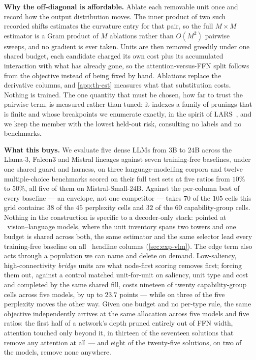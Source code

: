 \textbf{Why the off-diagonal is affordable.} Ablate each removable unit once and record how the output
distribution moves. The inner product of two such recorded shifts estimates the curvature entry for
that pair, so the full $M\times M$ estimator is a Gram product of $M$ ablations rather than $O(M^2)$
pairwise sweeps, and no gradient is ever taken. Units are then removed greedily under one shared
budget, each candidate charged its own cost plus its accumulated interaction with what has already
gone, so the attention-versus-FFN split follows from the objective instead of being fixed by hand.
Ablations replace the derivative columns, and \cref{app:th-est} measures what that substitution costs.
Nothing is trained. The one quantity that must be chosen, how far to
trust the pairwise term, is measured rather than tuned: it indexes a family of prunings that is finite
and whose breakpoints we enumerate exactly, in the spirit of LARS~\citep{efron2004lars}, and we keep
the member with the lowest held-out risk, consulting no labels and no benchmarks.

\textbf{What this buys.} We evaluate five dense LLMs from $3$B to $24$B across the Llama-3, Falcon3 and
Mistral lineages against seven training-free baselines, under one shared guard and harness, on three
language-modelling corpora and twelve multiple-choice benchmarks scored on their full test sets at
five ratios from $10\%$ to $50\%$, all five of them on Mistral-Small-24B. Against the per-column best of every baseline --- an
envelope, not one competitor --- \method takes $70$ of the $105$ cells this grid contains: $38$ of the
$45$ perplexity cells and $32$ of the $60$ capability-group cells. Nothing in the construction is
specific to a decoder-only stack: pointed at \vlmGridModelsW\ vision--language models, where the unit
inventory spans two towers and one budget is shared across both, the same estimator and the same
selector lead every training-free baseline on all \vlmNcolsW\ headline columns
(\cref{sec:exp-vlm}). The edge term also acts through a population we can name and
delete on demand. Low-saliency, high-connectivity \emph{bridge} units are what node-first scoring
removes first; forcing them out, against a control matched unit-for-unit on saliency, unit type and
cost and completed by the same shared fill, costs nineteen of twenty capability-group cells across
five models, by up to $23.7$ points --- while on three of the five perplexity moves the other way. Given one budget and no per-type rule, the same objective independently arrives at the
same allocation across five models and five ratios: the first half of a network's depth pruned
entirely out of FFN width, attention touched only beyond it, in thirteen of the seventeen solutions
that remove any attention at all --- and eight of the twenty-five solutions, on two of the models,
remove none anywhere.
